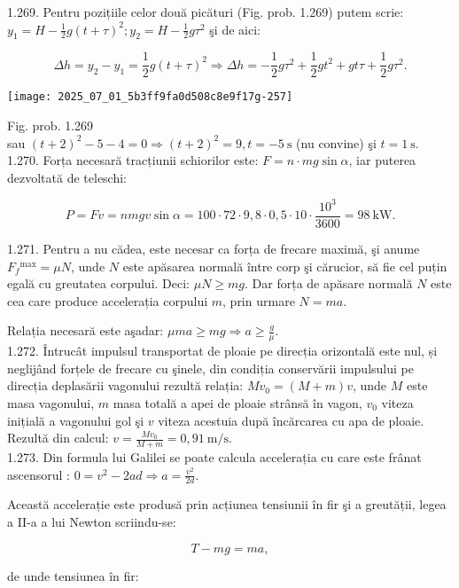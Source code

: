1.269. Pentru pozițiile celor două picături (Fig. prob. 1.269) putem scrie: $y_{1}=H-\frac{1}{2} g(t+\tau)^{2} ; y_{2}=H-\frac{1}{2} g \tau^{2}$ şi de aici:

$$
\Delta h=y_{2}-y_{1}=\frac{1}{2} g(t+\tau)^{2} \Rightarrow \Delta h=-\frac{1}{2} g \tau^{2}+\frac{1}{2} g t^{2}+g t \tau+\frac{1}{2} g \tau^{2} .
$$

\begin{center}
\texttt{[image: 2025\_07\_01\_5b3ff9fa0d508c8e9f17g-257]}
\end{center}

Fig. prob. 1.269\\
sau $(t+2)^{2}-5-4=0 \Rightarrow(t+2)^{2}=9, t=-5 \mathrm{~s}$ (nu convine) şi $t=1 \mathrm{~s}$.\\
1.270. Forța necesară tracțiunii schiorilor este: $F=n \cdot m g \sin \alpha$, iar puterea dezvoltată de teleschi:

$$
P=F v=n m g v \sin \alpha=100 \cdot 72 \cdot 9,8 \cdot 0,5 \cdot 10 \cdot \frac{10^{3}}{3600}=98 \mathrm{~kW} .
$$

1.271. Pentru a nu cădea, este necesar ca forța de frecare maximă, şi anume $F_{f}{ }^{\max }=\mu N$, unde $N$ este apăsarea normală între corp şi cărucior, să fie cel puțin egală cu greutatea corpului. Deci: $\mu N \geq m g$. Dar forța de apăsare normală $N$ este cea care produce accelerația corpului $m$, prin urmare $N=m a$.

Relația necesară este aşadar: $\mu m a \geq m g \Rightarrow a \geq \frac{g}{\mu}$.\\
1.272. Întrucât impulsul transportat de ploaie pe direcția orizontală este nul, și neglijând forțele de frecare cu şinele, din condiția conservării impulsului pe direcția deplasării vagonului rezultă relația: $M v_{0}=(M+m) v$, unde $M$ este masa vagonului, $m$ masa totală a apei de ploaie strânsă în vagon, $v_{0}$ viteza inițială a vagonului gol şi $v$ viteza acestuia după încărcarea cu apa de ploaie. Rezultă din calcul: $v=\frac{M v_{0}}{M+m}=0,91 \mathrm{~m} / \mathrm{s}$.\\
1.273. Din formula lui Galilei se poate calcula accelerația cu care este frânat ascensorul : $0=v^{2}-2 a d \Rightarrow a=\frac{v^{2}}{2 d}$.

Această accelerație este produsă prin acțiunea tensiunii în fir şi a greutății, legea a II-a a lui Newton scriindu-se:

$$
T-m g=m a,
$$

de unde tensiunea în fir:

